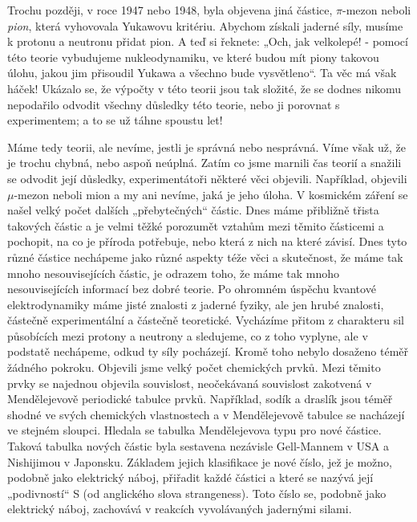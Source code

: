     Trochu později, v roce 1947 nebo 1948, byla objevena jiná částice, \(\pi\text{-mezon}\) neboli 
    \emph{pion}, která vyhovovala Yukawovu kritériu. Abychom získali jaderné síly, musíme k protonu a 
    neutronu přidat pion. A teď si řeknete: „Och, jak velkolepé! - pomocí této teorie vybudujeme 
    nukleodynamiku, ve které budou mít piony takovou úlohu, jakou jim přisoudil Yukawa a všechno bude 
    vysvětleno“. Ta věc má však háček! Ukázalo se, že výpočty v této teorii jsou tak složité, že se dodnes 
    nikomu nepodařilo odvodit všechny důsledky této teorie, nebo ji porovnat s experimentem; a to se už táhne 
    spoustu let!
    
    Máme tedy teorii, ale nevíme, jestli je správná nebo nesprávná. Víme však už, že je trochu chybná, nebo 
    aspoň neúplná. Zatím co jsme marnili čas teorií a snažili se odvodit její důsledky, experimentátoři 
    některé věci objevili. Například, objevili \(\mu\text{-mezon}\) neboli mion a my ani nevíme, jaká je jeho 
    úloha. V kosmickém záření se našel velký počet dalších „přebytečných“ částic. Dnes máme přibližně třista 
    takových částic a je velmi těžké porozumět vztahům mezi těmito částicemi a pochopit, na co je příroda 
    potřebuje, nebo která z nich na které závisí. Dnes tyto různé částice nechápeme jako různé aspekty téže 
    věci a skutečnost, že máme tak mnoho nesouvisejících částic, je odrazem toho, že máme tak mnoho 
    nesouvisejících informací bez dobré teorie. Po ohromném úspěchu kvantové elektrodynamiky máme jisté 
    znalosti z jaderné fyziky, ale jen hrubé znalosti, částečně experimentální a částečně teoretické. 
    Vycházíme přitom z charakteru sil působících mezi protony a neutrony a sledujeme, co z toho vyplyne, ale 
    v podstatě nechápeme, odkud ty síly pocházejí. Kromě toho nebylo dosaženo téměř žádného pokroku. 
    Objevili jsme velký počet chemických prvků. Mezi těmito prvky se najednou objevila souvislost, 
    neočekávaná souvislost zakotvená v Mendělejevově periodické tabulce prvků. Například, sodík a draslík 
    jsou téměř shodné ve svých chemických vlastnostech a v Mendělejevově tabulce se nacházejí ve stejném 
    sloupci. Hledala se tabulka Mendělejevova typu pro nové částice. Taková tabulka nových částic byla 
    sestavena nezávisle Gell-Mannem v USA a Nishijimou v Japonsku. Základem jejich klasifikace je nové číslo, 
    jež je možno, podobně jako elektrický náboj, přiřadit každé částici a které se nazývá její „podivností“ S 
    (od anglického slova strangeness). Toto číslo se, podobně jako elektrický náboj, zachovává v reakcích 
    vyvolávaných jadernými silami.  
   
\printbibliography[heading=subbibliography]
